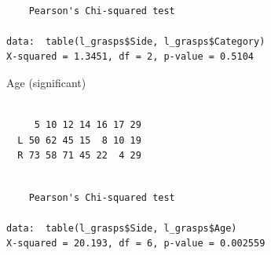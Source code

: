 \documentclass[
  letterpaper,
  DIV=11,
  numbers=noendperiod]{scrartcl}
\newenvironment{Shaded}{\begin{snugshade}}{\end{snugshade}}
\newcommand{\FunctionTok}[1]{\textcolor[rgb]{0.28,0.35,0.67}{#1}}
\newcommand{\NormalTok}[1]{\textcolor[rgb]{0.00,0.23,0.31}{#1}}
\newcommand{\SpecialCharTok}[1]{\textcolor[rgb]{0.37,0.37,0.37}{#1}}
\begin{document}
\begin{verbatim}

    Pearson's Chi-squared test

data:  table(l_grasps$Side, l_grasps$Category)
X-squared = 1.3451, df = 2, p-value = 0.5104
\end{verbatim}

Age (significant)

\begin{Shaded}
\end{Shaded}

\begin{verbatim}
   
     5 10 12 14 16 17 29
  L 50 62 45 15  8 10 19
  R 73 58 71 45 22  4 29
\end{verbatim}

\begin{Shaded}
\end{Shaded}

\begin{verbatim}

    Pearson's Chi-squared test

data:  table(l_grasps$Side, l_grasps$Age)
X-squared = 20.193, df = 6, p-value = 0.002559
\end{verbatim}
\end{document}
